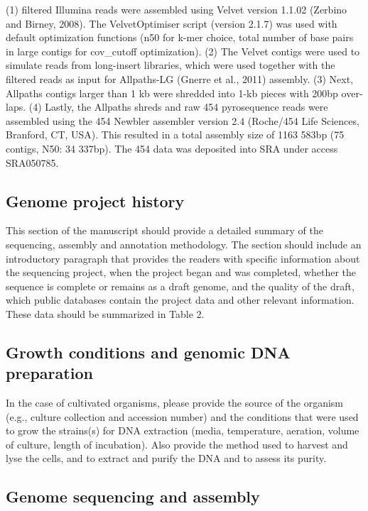 \documentclass{bmcart}
\begin{document}
(1) filtered Illumina reads were assembled using Velvet version 1.1.02 (Zerbino and Birney, 2008). The VelvetOptimiser script (version 2.1.7) was used with default optimization functions (n50 for k-mer choice, total number of base pairs in large contigs for cov_cutoff optimization). (2) The Velvet contigs were used to simulate reads from long-insert libraries, which were used together with the filtered reads as input for Allpaths-LG (Gnerre et al., 2011) assembly. (3) Next, Allpaths contigs larger than 1 kb were shredded into 1-kb pieces with 200bp over- laps. (4) Lastly, the Allpaths shreds and raw 454 pyrosequence reads were assembled using the 454 Newbler assembler version 2.4 (Roche/454 Life Sciences, Branford, CT, USA). This resulted in a total assembly size of 1163 583bp (75 contigs, N50: 34 337bp). The 454 data was deposited into SRA under access SRA050785.

\subsection*{Genome project history}
This section of the manuscript should provide a detailed summary of the sequencing, assembly and annotation methodology.  The section should include an introductory paragraph that provides the readers with specific information about the sequencing project, when the project began and was completed, whether the sequence is complete or remains as a draft genome, and the quality of the draft, which public databases contain the project data and other relevant information. These data should be summarized in Table 2.


\subsection*{Growth conditions and genomic DNA preparation}
In the case of cultivated organisms, please provide the source of the organism (e.g., culture collection and accession number) and the conditions that were used to grow the strains(s) for DNA extraction (media, temperature, aeration, volume of culture, length of incubation). Also provide the method used to harvest and lyse the cells, and to extract and purify the DNA and to assess its purity.


\subsection*{Genome sequencing and assembly}
\end{document}
